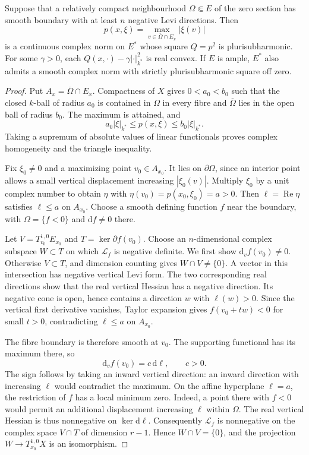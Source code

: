 \begin{theorem}\label{thm:concave-neighbourhood-dual-norm}
Suppose that a relatively compact neighbourhood $\Omega\Subset E$ of the zero section has smooth boundary with at least $n$ negative Levi directions. Then
\[
 p(x,\xi)=\max_{v\in\overline\Omega\cap E_x}|\xi(v)|
\]
is a continuous complex norm on $E^*$ whose square $Q=p^2$ is plurisubharmonic. For some $\gamma>0$, each $Q(x,\cdot)-\gamma|\cdot|_{k^*}^2$ is real convex. If $E$ is ample, $E^*$ also admits a smooth complex norm with strictly plurisubharmonic square off zero.
\end{theorem}
\begin{proof}
Put $A_x=\overline\Omega\cap E_x$. Compactness of $X$ gives $0<a_0<b_0$ such that the closed $k$-ball of radius $a_0$ is contained in $\Omega$ in every fibre and $\overline\Omega$ lies in the open ball of radius $b_0$. The maximum is attained, and
\[
 a_0|\xi|_{k^*}\leq p(x,\xi)\leq b_0|\xi|_{k^*}.
\]
Taking a supremum of absolute values of linear functionals proves complex homogeneity and the triangle inequality.

Fix $\xi_0\ne0$ and a maximizing point $v_0\in A_{x_0}$. It lies on $\partial\Omega$, since an interior point allows a small vertical displacement increasing $|\xi_0(v)|$. Multiply $\xi_0$ by a unit complex number to obtain $\eta$ with $\eta(v_0)=p(x_0,\xi_0)=a>0$. Then $\ell=\operatorname{Re}\eta$ satisfies $\ell\leq a$ on $A_{x_0}$. Choose a smooth defining function $f$ near the boundary, with $\Omega=\{f<0\}$ and $\mathrm df\ne0$ there.

Let $V=T^{1,0}_{v_0}E_{x_0}$ and $T=\ker\partial f(v_0)$. Choose an $n$-dimensional complex subspace $W\subset T$ on which $\mathcal L_f$ is negative definite. We first show $\mathrm d_vf(v_0)\ne0$. Otherwise $V\subset T$, and dimension counting gives $W\cap V\ne\{0\}$. A vector in this intersection has negative vertical Levi form. The two corresponding real directions show that the real vertical Hessian has a negative direction. Its negative cone is open, hence contains a direction $w$ with $\ell(w)>0$. Since the vertical first derivative vanishes, Taylor expansion gives $f(v_0+tw)<0$ for small $t>0$, contradicting $\ell\leq a$ on $A_{x_0}$.

The fibre boundary is therefore smooth at $v_0$. The supporting functional has its maximum there, so
\[
 \mathrm d_vf(v_0)=c\,\mathrm d\ell,\qquad c>0.
\]
The sign follows by taking an inward vertical direction: an inward direction with increasing $\ell$ would contradict the maximum. On the affine hyperplane $\ell=a$, the restriction of $f$ has a local minimum zero. Indeed, a point there with $f<0$ would permit an additional displacement increasing $\ell$ within $\Omega$. The real vertical Hessian is thus nonnegative on $\ker\mathrm d\ell$. Consequently $\mathcal L_f$ is nonnegative on the complex space $V\cap T$ of dimension $r-1$. Hence $W\cap V=\{0\}$, and the projection $W\to T^{1,0}_{x_0}X$ is an isomorphism.


\end{proof}
